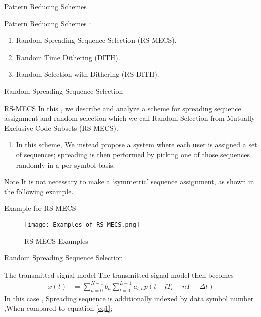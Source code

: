 \documentclass{beamer}
\begin{document}
\begin{frame}{Pattern Reducing Schemes}
\begin{block}{Pattern Reducing Schemes : }
\begin{enumerate}
    \item Random Spreading Sequence Selection (RS-MECS).
    \item Random Time Dithering (DITH).
    \item Random Selection with Dithering (RS-DITH).
\end{enumerate}
\end{block}
\end{frame}

\begin{frame}{Random Spreading Sequence Selection}
    \begin{block}{RS-MECS}
    In this , we describe and analyze a scheme for spreading sequence assignment and random selection which we call Random Selection from Mutually Exclusive Code Subsets (RS-MECS).
\begin{enumerate}
    \item In this scheme, We instead propose a system where each user is assigned a set of sequences; spreading is then performed by picking one of those sequences randomly in a per-symbol basis.
\end{enumerate}
    \end{block}
    \begin{block}{Note}
     It is not necessary to make a ‘symmetric’ sequence assignment, as shown in the following example.
    \end{block}
\end{frame}

\begin{frame}{Example for RS-MECS}
\begin{figure}
    \centering
    \texttt{[image: Examples of RS-MECS.png]}
    \caption{RS-MECS Examples}
    \label{fig:1}
\end{figure}
\end{frame}

\begin{frame}{Random Spreading Sequence Selection}
\begin{block}{The transmitted signal model}
   The transmitted signal model then becomes
\begin{align}
    x(t)& = \sum_{n = 0}^{N-1}b_{n}\sum_{l= 0}^{L-1}a_{l,n}p(t - lT_{c} -nT - \Delta t)
    \label{eq2}
\end{align}
   In this case , Spreading sequence is additionally indexed by data symbol number ,When compared to equation \eqref{eq1};
\end{block}
\end{frame}
\end{document}
